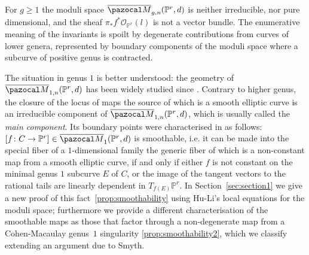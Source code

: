 \documentclass[11pt]{amsart}
\newcommand{\M}[4]{\overline{\pazocal M}_{#1,#2}(#3,#4)}
\newcommand{\PP}{\mathbb P}
\renewcommand{\to}{\rightarrow}
\newcommand{\oM}{\overline{\pazocal M}}
\theoremstyle{plain}
\theoremstyle{definition}
\begin{document}
For $g\geq 1$ the moduli space $\M{g}{n}{\PP^r}{d}$ is neither irreducible, nor pure dimensional, and the sheaf $\pi_*f^*\mathcal O_{\PP^r}(l)$ is not a vector bundle. The enumerative meaning of the invariants is spoilt by degenerate contributions from curves of lower genera, represented by boundary components of the moduli space where a subcurve of positive genus is contracted.

The situation in genus $1$ is better understood: the geometry of $\M{1}{n}{\PP^r}{d}$ has been widely studied since \cite{Vre}. Contrary to higher genus, the closure of the locus of maps the source of which is a smooth elliptic curve is an irreducible component of $\M{1}{n}{\PP^r}{d}$, which is usually called the \emph{main component}.
Its boundary points were characterised in \cite{Vre} as follows: $[f\colon C\to \PP^r]\in\oM_1(\PP^r,d)$ is smoothable, i.e. it can be made into the special fiber of a $1$-dimensional family the generic fiber of which is a non-constant map from a smooth elliptic curve, if and only if either $f$ is not constant on the minimal genus $1$ subcurve $E$ of $C$, or the image of the tangent vectors to the rational tails are linearly dependent in $T_{f(E)}\PP^r.$  In Section~\ref{sec:section1} we give a new proof of this fact~\ref{prop:smoothability} using Hu-Li's local equations for the moduli space; furthermore we provide a different characterisation of the smoothable maps as those that factor through a non-degenerate map from a Cohen-Macaulay genus~$1$ singularity \ref{prop:smoothability2}, which we classify extending an argument due to Smyth.
\end{document}
